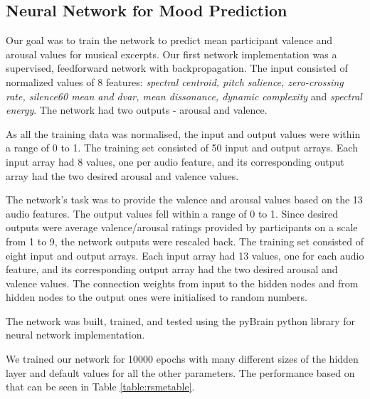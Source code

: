\subsection{Neural Network for Mood Prediction}

Our goal was to train the network to predict mean participant valence and arousal values for musical excerpts. 
Our first network implementation was a supervised, feedforward network with backpropagation. 
The input consisted of normalized values of 8 features:
\textit{spectral centroid, pitch salience, zero-crossing rate, silence60 mean  and dvar, mean dissonance, dynamic complexity} and \textit{spectral energy}. 
The network had two outputs - arousal and valence.

As all the training data was normalised, the input and output values were within a range of 0 to 1. The training set consisted of 50 input and output arrays. Each input array had 8 values, one per audio feature, and its corresponding output array had the two desired arousal and valence values.

The network’s task was to provide the valence and arousal values based on the 13 audio features. The output values fell within a range of 0 to 1. Since desired outputs were average valence/arousal ratings provided by participants on a scale from 1 to 9, the network outputs were rescaled back. The training set consisted of eight input and output arrays. Each input array had 13 values, one for each audio feature, and its corresponding output array had the two desired arousal and valence values. The connection weights from input to the hidden nodes and from hidden nodes to the output ones were initialised to random numbers. 

The network was built, trained, and tested using the pyBrain python library for neural network implementation. 

We trained our network for 10000 epochs with many different sizes of the hidden layer and default values for all the other parameters. The performance based on that can be seen in Table \ref{table:rsmetable}.

